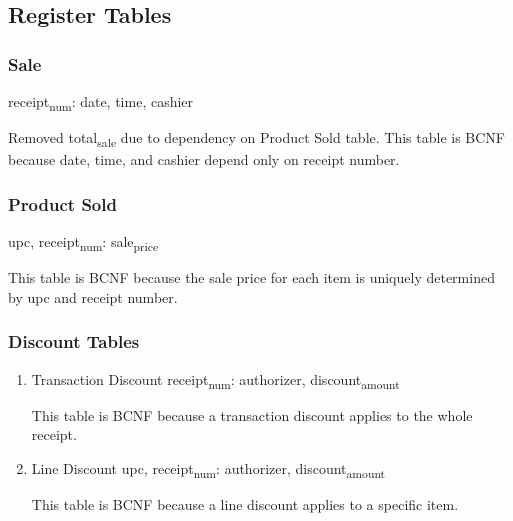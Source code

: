 \documentclass[11pt]{article}
\begin{document}
\subsection{Register Tables}
\label{sec:orga4019dc}
\subsubsection{Sale}
\label{sec:org90c2649}
receipt\textsubscript{num}: date, time, cashier

Removed total\textsubscript{sale} due to dependency on Product Sold table.
This table is BCNF because date, time, and cashier depend only on receipt number.
\subsubsection{Product Sold}
\label{sec:org9615a18}
upc, receipt\textsubscript{num}: sale\textsubscript{price}

This table is BCNF because the sale price for each item is uniquely determined by upc and receipt number.
\subsubsection{Discount Tables}
\label{sec:orge14568e}
\begin{enumerate}
\item Transaction Discount
\label{sec:org368356d}
receipt\textsubscript{num}: authorizer, discount\textsubscript{amount}

This table is BCNF because a transaction discount applies to the whole receipt.
\item Line Discount
\label{sec:orgd490a8e}
upc, receipt\textsubscript{num}: authorizer, discount\textsubscript{amount}

This table is BCNF because a line discount applies to a specific item.
\end{enumerate}
\end{document}
